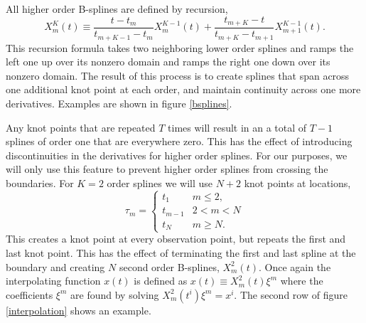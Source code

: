 \documentclass[10pt,journal]{IEEEtran}
\begin{document}
All higher order B-splines are defined by recursion,
\begin{equation}
X^K_m(t) \equiv \frac{t - t_m}{t_{m+K-1} - t_m} X^{K-1}_m(t) + \frac{t_{m+K}-t}{t_{m+K} - t_{m+1}} X^{K-1}_{m+1}(t).
\end{equation}
This recursion formula takes two neighboring lower order splines and ramps the left one up over its nonzero domain and ramps the right one down over its nonzero domain. The result of this process is to create splines that span across one additional knot point at each order, and maintain continuity across one more derivatives. Examples are shown in figure \ref{bsplines}.

Any knot points that are repeated $T$ times will result in an a total of $T-1$ splines of order one that are everywhere zero. This has the effect of introducing discontinuities in the derivatives for higher order splines. For our purposes, we will only use this feature to prevent higher order splines from crossing the boundaries. For $K=2$ order splines we will use $N+2$ knot points at locations,
\begin{equation}
\tau_m = \begin{cases}
t_1      	& \text{$m \leq 2$}, \\
t_{m-1}	& \text{$2 < m < N$}\\
t_N 		& \text{$m \geq N$}.
\end{cases}
\end{equation}
This creates a knot point at every observation point, but repeats the first and last knot point. This has the effect of terminating the first and last spline at the boundary and creating $N$ second order B-splines, $X^2_m(t)$. Once again the interpolating function $x(t)$ is defined as $x(t) \equiv  X^2_m(t) \xi^m$ where the coefficients $\xi^m$ are found by solving $X^2_m(t^i) \xi^m = x^i$. The second row of figure \ref{interpolation} shows an example.
\end{document}
